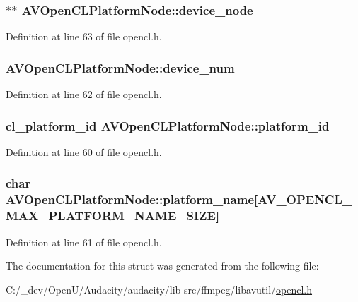 \subsubsection[{\texorpdfstring{device\+\_\+node}{device_node}}]{$\ast$$\ast$ A\+V\+Open\+C\+L\+Platform\+Node\+::device\+\_\+node}\hypertarget{struct_a_v_open_c_l_platform_node_a7e7d9bc19eda4c18962ab50605d12bf7}{}\label{struct_a_v_open_c_l_platform_node_a7e7d9bc19eda4c18962ab50605d12bf7}


Definition at line 63 of file opencl.\+h.

\subsubsection[{\texorpdfstring{device\+\_\+num}{device_num}}]{ A\+V\+Open\+C\+L\+Platform\+Node\+::device\+\_\+num}\hypertarget{struct_a_v_open_c_l_platform_node_ab5e146a2528a5f697f12b05fb2711599}{}\label{struct_a_v_open_c_l_platform_node_ab5e146a2528a5f697f12b05fb2711599}


Definition at line 62 of file opencl.\+h.

\subsubsection[{\texorpdfstring{platform\+\_\+id}{platform_id}}]{\setlength{\rightskip}{0pt plus 5cm}cl\+\_\+platform\+\_\+id A\+V\+Open\+C\+L\+Platform\+Node\+::platform\+\_\+id}\hypertarget{struct_a_v_open_c_l_platform_node_a02647b5b2a64d1761f48ca36cd339419}{}\label{struct_a_v_open_c_l_platform_node_a02647b5b2a64d1761f48ca36cd339419}


Definition at line 60 of file opencl.\+h.

\subsubsection[{\texorpdfstring{platform\+\_\+name}{platform_name}}]{\setlength{\rightskip}{0pt plus 5cm}char A\+V\+Open\+C\+L\+Platform\+Node\+::platform\+\_\+name\mbox{[}{\bf A\+V\+\_\+\+O\+P\+E\+N\+C\+L\+\_\+\+M\+A\+X\+\_\+\+P\+L\+A\+T\+F\+O\+R\+M\+\_\+\+N\+A\+M\+E\+\_\+\+S\+I\+ZE}\mbox{]}}\hypertarget{struct_a_v_open_c_l_platform_node_afe033381b1ff0feae605c075183b9528}{}\label{struct_a_v_open_c_l_platform_node_afe033381b1ff0feae605c075183b9528}


Definition at line 61 of file opencl.\+h.



The documentation for this struct was generated from the following file\+:\begin{DoxyCompactItemize}
\item 
C\+:/\+\_\+dev/\+Open\+U/\+Audacity/audacity/lib-\/src/ffmpeg/libavutil/\hyperlink{opencl_8h}{opencl.\+h}\end{DoxyCompactItemize}
